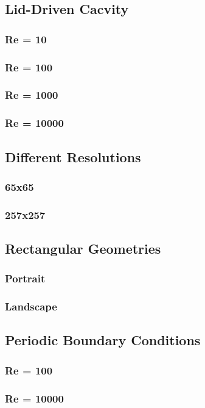 \subsection*{Lid-\/\+Driven Cacvity}

\subsubsection*{Re = 10}

 

\subsubsection*{Re = 100}

 

\subsubsection*{Re = 1000}

 

\subsubsection*{Re = 10000}

 

\subsection*{Different Resolutions}

\subsubsection*{65x65}

 

\subsubsection*{257x257}

 

\subsection*{Rectangular Geometries}

\subsubsection*{Portrait}

 

\subsubsection*{Landscape}

 

\subsection*{Periodic Boundary Conditions}

\subsubsection*{Re = 100}

 

\subsubsection*{Re = 10000}

  